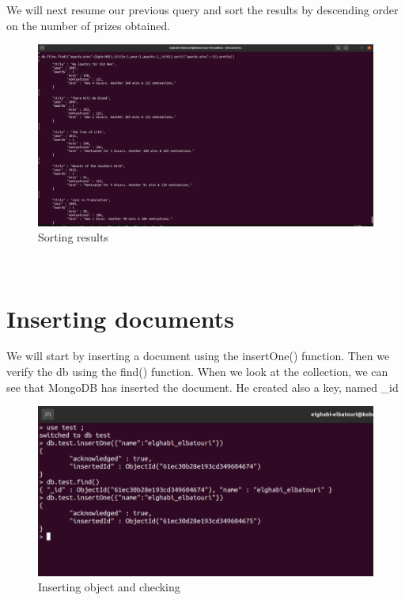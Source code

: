 \begin{spacing}{0.9}
\par We will next resume our previous query and sort the results by descending order on the number of prizes obtained.
\\
\begin{figure}[!htb] 
\begin{center} 
\includegraphics[width=1\linewidth]{Pictures/MongoDB/Examining MongoDB Query Features/Advanced search/Sorting results} 
\end{center} 
\caption{Sorting results} 
\end{figure}  \FloatBarrier
\\
\section{Inserting documents }
\par We will start by inserting a document using the insertOne() function. Then we verify the db using the find() function. When we look at the collection, we can see that MongoDB has inserted the document. He created also a key, named \_id
\\
\begin{figure}[!htb] 
\begin{center} 
\includegraphics[width=1\linewidth]{Pictures/MongoDB/Examining MongoDB Query Features/Inserting documents/Inserting object and checking} 
\end{center} 
\caption{Inserting object and checking} 
\end{figure}  \FloatBarrier
\\


\end{spacing}
